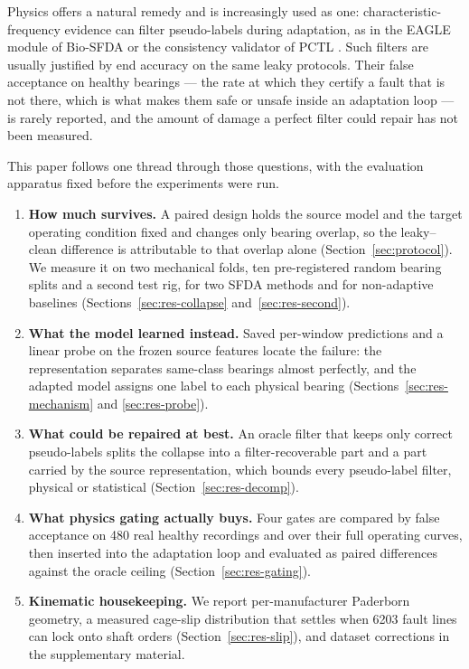 Physics offers a natural remedy and is increasingly used as one: characteristic-frequency evidence can filter pseudo-labels
during adaptation, as in the EAGLE module of Bio-SFDA \cite{yoon2026biosfda} or the consistency validator of PCTL
\cite{pctl2026}. Such filters are usually justified by end accuracy on the same leaky protocols. Their false acceptance on
healthy bearings --- the rate at which they certify a fault that is not there, which is what makes them safe or unsafe inside
an adaptation loop --- is rarely reported, and the amount of damage a perfect filter could repair has not been measured.

This paper follows one thread through those questions, with the evaluation apparatus fixed before the experiments were run.

\begin{enumerate}
  \item \textbf{How much survives.} A paired design holds the source model and the target operating condition fixed and
        changes only bearing overlap, so the leaky--clean difference is attributable to that overlap alone
        (Section~\ref{sec:protocol}). We measure it on two mechanical folds, ten pre-registered random bearing splits and a
        second test rig, for two SFDA methods and for non-adaptive baselines (Sections~\ref{sec:res-collapse}
        and~\ref{sec:res-second}).
  \item \textbf{What the model learned instead.} Saved per-window predictions and a linear probe on the frozen source
        features locate the failure: the representation separates same-class bearings almost perfectly, and the adapted
        model assigns one label to each physical bearing (Sections~\ref{sec:res-mechanism} and \ref{sec:res-probe}).
  \item \textbf{What could be repaired at best.} An oracle filter that keeps only correct pseudo-labels splits the collapse
        into a filter-recoverable part and a part carried by the source representation, which bounds every pseudo-label
        filter, physical or statistical (Section~\ref{sec:res-decomp}).
  \item \textbf{What physics gating actually buys.} Four gates are compared by false acceptance on 480 real healthy
        recordings and over their full operating curves, then inserted into the adaptation loop and evaluated as paired
        differences against the oracle ceiling (Section~\ref{sec:res-gating}).
  \item \textbf{Kinematic housekeeping.} We report per-manufacturer Paderborn geometry, a measured cage-slip distribution
        that settles when 6203 fault lines can lock onto shaft orders (Section~\ref{sec:res-slip}), and dataset corrections
        in the supplementary material.
\end{enumerate}

